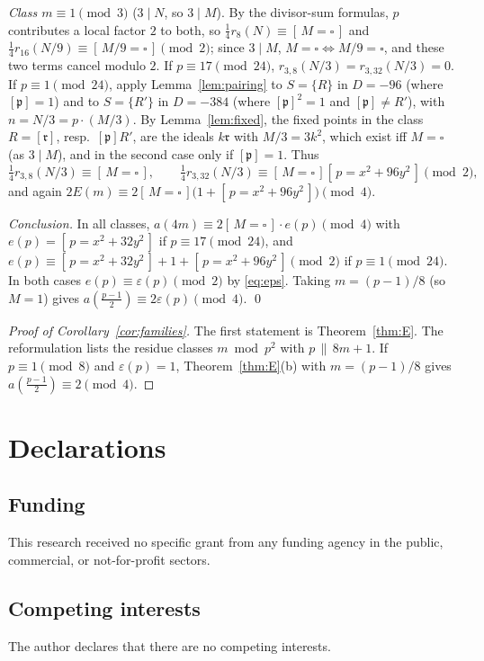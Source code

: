 \documentclass[11pt]{amsart}
\theoremstyle{definition}
\theoremstyle{remark}
\numberwithin{equation}{section}
\newcommand{\fp}{\mathfrak{p}}
\newcommand{\fr}{\mathfrak{r}}
\newcommand{\sq}{\square}
\newcommand{\ind}[1]{[\,#1\,]}
\begin{document}
\emph{Class $m\equiv1\pmod 3$} ($3\mid N$, so $3\mid M$). By the divisor-sum formulas, $p$ contributes a local factor $2$ to both, so $\frac14r_8(N)\equiv\ind{M=\sq}$ and $\frac14r_{16}(N/9)\equiv\ind{M/9=\sq}\pmod 2$; since $3\mid M$, $M=\sq\iff M/9=\sq$, and these two terms cancel modulo $2$. If $p\equiv17\pmod{24}$, $r_{3,8}(N/3)=r_{3,32}(N/3)=0$. If $p\equiv1\pmod{24}$, apply Lemma~\ref{lem:pairing} to $S=\{R\}$ in $D=-96$ (where $[\fp]=1$) and to $S=\{R'\}$ in $D=-384$ (where $[\fp]^2=1$ and $[\fp]\neq R'$), with $n=N/3=p\cdot(M/3)$. By Lemma~\ref{lem:fixed}, the fixed points in the class $R=[\fr]$, resp.\ $[\fp]R'$, are the ideals $k\fr$ with $M/3=3k^2$, which exist iff $M=\sq$ (as $3\mid M$), and in the second case only if $[\fp]=1$. Thus
\[
\tfrac14r_{3,8}(N/3)\equiv\ind{M=\sq},\qquad \tfrac14r_{3,32}(N/3)\equiv\ind{M=\sq}\ind{p=x^2+96y^2}\pmod 2,
\]
and again $2E(m)\equiv2\ind{M=\sq}\big(1+\ind{p=x^2+96y^2}\big)\pmod 4$.

\emph{Conclusion.} In all classes, $a(4m)\equiv2\ind{M=\sq}\cdot e(p)\pmod 4$ with $e(p)=\ind{p=x^2+32y^2}$ if $p\equiv17\pmod{24}$, and $e(p)\equiv\ind{p=x^2+32y^2}+1+\ind{p=x^2+96y^2}\pmod 2$ if $p\equiv1\pmod{24}$. In both cases $e(p)\equiv\varepsilon(p)\pmod 2$ by \eqref{eq:eps}. Taking $m=(p-1)/8$ (so $M=1$) gives $a(\frac{p-1}{2})\equiv2\varepsilon(p)\pmod 4$. \qed

\begin{proof}[Proof of Corollary~\ref{cor:families}]
The first statement is Theorem~\ref{thm:E}. The reformulation lists the residue classes $m\bmod p^2$ with $p\,\|\,8m+1$. If $p\equiv1\pmod 8$ and $\varepsilon(p)=1$, Theorem~\ref{thm:E}(b) with $m=(p-1)/8$ gives $a(\frac{p-1}{2})\equiv2\pmod 4$.
\end{proof}

\section*{Declarations}

\subsection*{Funding}
This research received no specific grant from any funding agency in the public, commercial, or not-for-profit sectors.

\subsection*{Competing interests}
The author declares that there are no competing interests.
\end{document}
